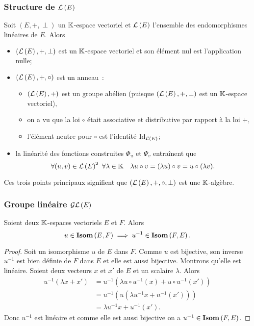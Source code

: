 \subsubsection{Structure de \(\mathcal{L}\left(E\right)\)}

Soit \((E,+,\perp)\) un \(\mathbb{K}\)-espace vectoriel et \(\mathcal{L}\left(E\right)\) l'ensemble des 
endomorphismes linéaires de \(E\). Alors
\begin{itemize}
  \item \((\mathcal{L}\left(E\right),+,\perp)\) est un \(\mathbb{K}\)-espace vectoriel et son élément nul 
    est l'application nulle;
  \item \((\mathcal{L}\left(E\right), +, \circ)\) est un anneau~:
    \begin{itemize}
      \item \((\mathcal{L}\left(E\right),+)\) est un groupe abélien (puisque 
        \((\mathcal{L}\left(E\right),+,\perp)\) est un \(\mathbb{K}\)-espace vectoriel),
      \item on a vu que la loi \(\circ\) était associative et distributive par 
        rapport à la loi \(+\),
      \item l'élément neutre pour \(\circ\) est l'identité \(\operatorname{Id}_{\mathcal{L}\left(E\right)}\);
    \end{itemize}
  \item la linéarité des fonctions construites \(\Phi_u\) et \(\Psi_v\) 
    entraînent que
    \begin{equation}
      \forall (u,v) \in \mathcal{L}\left(E\right)^2 \ \forall \lambda \in \mathbb{K} \quad \lambda u 
      \circ v = (\lambda u) \circ v = u \circ (\lambda v).
    \end{equation}
\end{itemize}

Ces trois points principaux signifient que \((\mathcal{L}\left(E\right), +, \circ, \perp)\) est 
une \(\mathbb{K}\)-algèbre.

\subsubsection{Groupe linéaire \(\mathcal{GL}\left(E\right)\)}

\begin{theo}
  Soient deux \(\mathbb{K}\)-espaces vectoriels \(E\) et \(F\). Alors
  \begin{equation}
    u \in \mathbf{Isom}\left(E,F\right) \implies u^{-1} \in \mathbf{Isom}\left(F,E\right).
  \end{equation}
\end{theo}
\begin{proof}
  Soit un isomorphisme \(u\) de \(E\) dans \(F\). Comme \(u\) est bijective, son 
  inverse \(u^{-1}\) est bien définie de \(F\) dans \(E\) et elle est aussi 
  bijective. Montrons qu'elle est linéaire. Soient deux vecteurs \(x\) et \(x'\) 
  de \(E\) et un scalaire \(\lambda\). Alors
  \begin{align}
    u^{-1}(\lambda x+x') &= u^{-1}(\lambda u\circ u^{-1} (x) + u \circ 
    u^{-1}(x')) \\
    &=u^{-1}(u(\lambda u^{-1} x +u^{-1}(x'))) \\
    &=\lambda u^{-1} x +u^{-1}(x').
  \end{align}
  Donc \(u^{-1}\) est linéaire et comme elle est aussi bijective on a \(u^{-1} 
  \in \mathbf{Isom}\left(F,E\right)\).
\end{proof}

